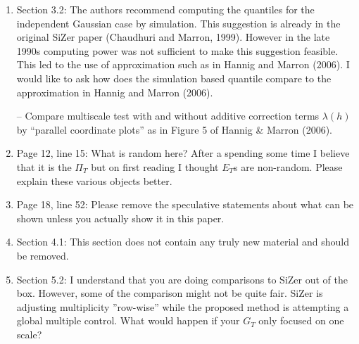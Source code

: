 \documentclass[a4paper,12pt]{article}
\begin{document}
\newpage
{} 
\vspace{0.25cm}

\begin{enumerate}
\item Section 3.2: The authors recommend computing the quantiles for the independent Gaussian case by simulation. This suggestion is already in the original SiZer paper (Chaudhuri and Marron, 1999). However in the late 1990s computing power was not sufficient to make this suggestion feasible. This led to the use of approximation such as in Hannig and Marron (2006). I would like to ask how does the simulation based quantile compare to the approximation in Hannig and Marron (2006). 

-- Compare multiscale test with and without additive correction terms $\lambda(h)$ by ``parallel coordinate plots'' as in Figure 5 of Hannig \& Marron (2006). 

\item Page 12, line 15: What is random here? After a spending some time I believe that it is the $\Pi_T$ but on first reading I thought $E_T$s are non-random. Please explain these various objects better.
\item Page 18, line 52: Please remove the speculative statements about what can be shown unless you actually show it in this paper.

\item Section 4.1: This section does not contain any truly new material and should be removed.

\item Section 5.2: I understand that you are doing comparisons to SiZer out of the box. However, some of the comparison might not be quite fair. SiZer is adjusting multiplicity ”row-wise” while the proposed method is attempting a global multiple control. What would happen if your $G_T$ only focused on one scale?


\end{enumerate}
\end{document}
